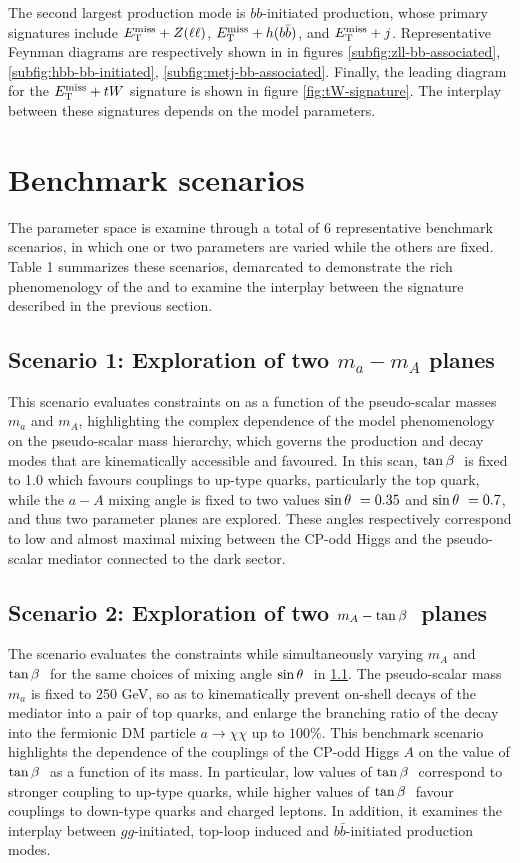 The second largest production mode is $bb$-initiated production, whose primary signatures include $E_{\mathrm{T}}^{\mathrm{miss}}+Z(\ell\ell)$, $E_{\mathrm{T}}^{\mathrm{miss}}+h(b\bar{b})$, and $E_{\mathrm{T}}^{\mathrm{miss}}+j$. Representative Feynman diagrams are respectively shown in in figures \ref{subfig:zll-bb-associated}, \ref{subfig:hbb-bb-initiated}, \ref{subfig:metj-bb-associated}. Finally, the leading diagram for the $E_{\mathrm{T}}^{\mathrm{miss}}+tW$ signature is shown in figure \ref{fig:tW-signature}. The interplay between these signatures depends on the \thdma model parameters. 

\section{Benchmark scenarios}
\label{sect:benchmark-scenarios}
The parameter space is examine through a total of 6 representative benchmark scenarios, in which one or two parameters are varied while the others are fixed. Table 1 summarizes these scenarios, demarcated to demonstrate the rich phenomenology of the \thdma and to examine the interplay between the signature described in the previous section.

\subsection{Scenario 1: Exploration of two \texorpdfstring{$m_a-m_A$}{TEXT} planes}\label{subsection:ma-mA-scan}
This scenario evaluates constraints on \thdma as a function of the pseudo-scalar masses $m_a$ and $m_A$, highlighting the complex dependence of the model phenomenology on the pseudo-scalar mass hierarchy, which governs the production and decay modes that are kinematically accessible and favoured. In this scan, $\tan\beta~$ is fixed to 1.0 which favours couplings to up-type quarks, particularly the top quark, while the $a-A$ mixing angle is fixed to two values $\sin\theta~=0.35$ and $\sin\theta~=0.7$, and thus two parameter planes are explored. These angles respectively correspond to low and almost maximal mixing between the CP-odd Higgs and the pseudo-scalar mediator connected to the dark sector.

\subsection{Scenario 2: Exploration of two \texorpdfstring{$m_A-\tan\beta~$}{TEXT} planes}\label{subsection:mA-tanb-scan}

The scenario evaluates the constraints while simultaneously varying $m_A$ and $\tan\beta~$ for the same choices of mixing angle $\sin\theta~$ in \ref{subsection:ma-mA-scan}. The pseudo-scalar mass $m_a$ is fixed to 250 GeV, so as to kinematically prevent on-shell decays of the mediator into a pair of top quarks, and enlarge the branching ratio of the decay into the fermionic DM particle $a\rightarrow \chi\chi$ up to $100\%$. This benchmark scenario highlights the dependence of the couplings of the CP-odd Higgs $A$ on the value of $\tan\beta~$ as a function of its mass. In particular, low values of $\tan\beta~$ correspond to stronger coupling to up-type quarks, while higher values of $\tan\beta~$ favour couplings to down-type quarks and charged leptons. In addition, it examines the interplay between $gg$-initiated, top-loop induced and $b\bar{b}$-initiated production modes. 

